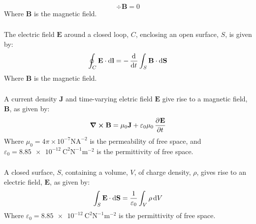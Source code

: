 \subsubsection{}
\begin{equation*}
    \div{\mathbf{B}} = 0
\end{equation*}
Where $ \mathbf{B} $ is the magnetic field.

\subsubsection{}
The electric field $ \mathbf{E} $ around a closed loop, $ C $, enclosing an open surface, $ S $, is given by:
\begin{equation*}
    \oint_C \mathbf{E} \cdot \dif \mathbf{l} = - \dod{}{t} \int_S \mathbf{B} \cdot \dif \mathbf{S}
\end{equation*}
Where $ \mathbf{B} $ is the magnetic field.

\subsubsection{}
A current density $ \mathbf{J} $ and time-varying eletric field $ \mathbf{E} $ give rise to a magnetic field, $ \mathbf{B} $, as given by:
\begin{equation*}
    \curl{\mathbf{B}} = \mu_0 \mathbf{J} + \varepsilon_0 \mu_0 \dpd{\mathbf{E}}{t}
\end{equation*}
Where $ \mu_0 = 4 \pi \times 10^{-7} \si{\newton\ampere\tothe{-2}} $ is the permeability of free space, and $ \varepsilon_0 = \SI{8.85e-12}{\coulomb\tothe{2}\newton\tothe{-1}\metre\tothe{-2}} $ is the permittivity of free space.

\subsubsection{}
A closed surface, $ S $, containing a volume, $ V $, of charge density, $ \rho $, gives rise to an electric field, $ \mathbf{E} $, as given by:
\begin{equation*}
    \int_S \mathbf{E} \cdot \dif \mathbf{S} = \frac{1}{\varepsilon_0} \int_V \rho \dif V
\end{equation*}
Where $ \varepsilon_0 = \SI{8.85e-12}{\coulomb\tothe{2}\newton\tothe{-1}\metre\tothe{-2}} $ is the permittivity of free space.
